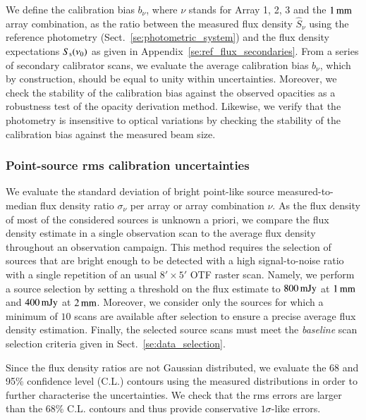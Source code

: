 \documentclass[traditionalabstract]{aa}
\newcommand{\lp}[1]{#1}
\newcommand{\rev}[1]{#1}
\begin{document}
We define the calibration bias
$b_{\nu}$, where $\nu$ stands for Array 1, 2, 3 and the
$1\,\rm{mm}$ array combination, as
the ratio between the measured flux density $\hat{S}_{\nu}$ using the
reference photometry
(Sect.~\ref{se:photometric_system}) and the flux density
expectations $S_{\rm{s}}(\nu_0)$ as given in
Appendix~\ref{se:ref_flux_secondaries}. From a series of
secondary calibrator scans, we evaluate the average calibration bias
$b_{\nu}$, which by construction, should be equal to
unity within uncertainties.
Moreover, we check the stability of the calibration bias against
the observed opacities as a robustness test of the
opacity derivation method. Likewise, we verify that the photometry is
insensitive to optical variations by checking the stability of the
calibration bias against the measured beam size.

\subsubsection{{\rev Point-source} rms calibration uncertainties}
\label{se:def_calibration_rms_error}
We evaluate the standard deviation of bright {\rev point-like} source
measured-to-median flux density ratio $\sigma_{\nu}$ per array or array combination $\nu$.
As the flux density of most of the considered sources is unknown a priori, we
compare the flux density estimate in a single observation scan to the
average flux density throughout an observation campaign. This method
requires the selection of sources that are bright enough to be
detected with a high signal-to-noise ratio with a single repetition of an usual
$8'\times 5'$ OTF raster scan. Namely, we perform a source
selection by setting a threshold on the flux estimate to $800\,\rm{mJy}$ at
$1\,\rm{mm}$ and $400\,\rm{mJy}$ at $2\,\rm{mm}$. Moreover, we consider
only the sources for which a minimum of $10$ scans are available after
selection to ensure a precise average flux density
estimation. Finally, the selected source scans must meet the \emph{baseline}
scan selection criteria given in Sect.~\ref{se:data_selection}.

{\lp Since the flux density ratios are not Gaussian distributed, we
evaluate the 68 and 95\% confidence level (C.L.) contours using the
measured distributions in order to further characterise the
uncertainties. We check that the rms
errors are larger than the 68\% C.L. contours and thus provide
conservative $1\sigma$-like errors.}    
\end{document}
